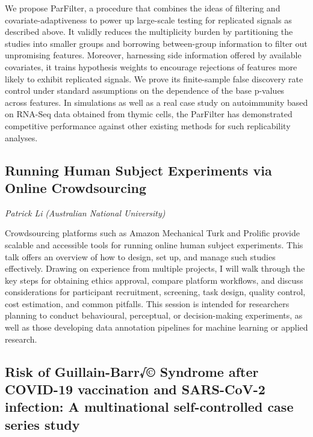 \documentclass[
]{scrreprt}
\begin{document}
We propose ParFilter, a procedure that combines the ideas of filtering
and covariate-adaptiveness to power up large-scale testing for
replicated signals as described above. It validly reduces the
multiplicity burden by partitioning the studies into smaller groups and
borrowing between-group information to filter out unpromising features.
Moreover, harnessing side information offered by available covariates,
it trains hypothesis weights to encourage rejections of features more
likely to exhibit replicated signals. We prove its finite-sample false
discovery rate control under standard assumptions on the dependence of
the base p-values across features. In simulations as well as a real case
study on autoimmunity based on RNA-Seq data obtained from thymic cells,
the ParFilter has demonstrated competitive performance against other
existing methods for such replicability analyses.

\subsection{Running Human Subject Experiments via Online
Crowdsourcing}\label{running-human-subject-experiments-via-online-crowdsourcing}

\emph{Patrick Li} \emph{(Australian National
University)}

\setlength{\parskip}{0.5em}

Crowdsourcing platforms such as Amazon Mechanical Turk and Prolific
provide scalable and accessible tools for running online human subject
experiments. This talk offers an overview of how to design, set up, and
manage such studies effectively. Drawing on experience from multiple
projects, I will walk through the key steps for obtaining ethics
approval, compare platform workflows, and discuss considerations for
participant recruitment, screening, task design, quality control, cost
estimation, and common pitfalls. This session is intended for
researchers planning to conduct behavioural, perceptual, or
decision-making experiments, as well as those developing data annotation
pipelines for machine learning or applied research.

\subsection{Risk of Guillain-Barr√© Syndrome after COVID-19 vaccination
and SARS-CoV-2 infection: A multinational self-controlled case series
study}\label{risk-of-guillain-barr-syndrome-after-covid-19-vaccination-and-sars-cov-2-infection-a-multinational-self-controlled-case-series-study}
\end{document}
